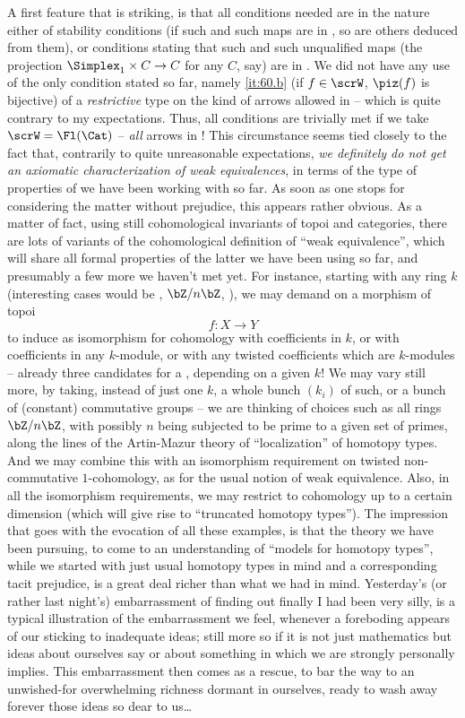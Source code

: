 A first feature that is striking, is that all conditions needed are in
the nature either of stability conditions (if such and such maps are
in \scrW, so are others deduced from them), or conditions stating that
such and such unqualified maps (the projection $\Simplex_1\times C\to C$
for any $C$, say) are in \scrW. We did not have any use of the only
condition stated so far, namely \ref{it:60.b} (if $f\in\scrW$,
$\piz(f)$ is bijective) of a \emph{restrictive} type on the kind of
arrows allowed in \scrW{} -- which is quite contrary to my
expectations. Thus, all conditions are trivially met if we
take $\scrW=\Fl(\Cat)$ -- \emph{all} arrows in \Cat! This
circumstance seems tied closely to the fact that, contrarily to quite
unreasonable expectations, \emph{we definitely do \emph{not} get an
  axiomatic characterization of weak equivalences}, in terms of the
type of properties of \scrW{} we have been working with so far. As
soon as one stops for considering the matter without prejudice, this
appears rather obvious. As a matter of fact, using still cohomological
invariants of topoi and categories, there are lots of variants of the
cohomological definition of ``weak equivalence'', which will share all
formal properties of the latter we have been using so far, and
presumably a few more we haven't met yet. For instance, starting with
any ring $k$ (interesting cases would be \bZ, $\bZ/n\bZ$, \bQ), we may
demand on a morphism of topoi
\[f:X\to Y\]
to induce as isomorphism for cohomology with coefficients in $k$, or
with coefficients in any $k$-module, or with any twisted coefficients
which are $k$-modules -- already three candidates for a \scrW,
depending on a given $k$! We may vary still more, by taking, instead
of just one $k$, a whole bunch $(k_i)$ of such, or a bunch of
(constant) commutative groups -- we are thinking of choices such as
all rings $\bZ/n\bZ$, with possibly $n$ being subjected to be prime to
a given set of primes, along the lines of the Artin-Mazur theory of
``localization'' of homotopy types. And we may combine this with an
isomorphism requirement on twisted non-commutative $1$-cohomology, as
for the usual notion of weak equivalence. Also, in all the isomorphism
requirements, we may restrict to cohomology up to a certain dimension
(which will give rise to ``truncated homotopy types''). The impression
that goes with the evocation of all these examples, is that the theory
we have been pursuing, to come to an understanding of ``models for
homotopy types'', while we started with just usual homotopy types in
mind and a corresponding tacit prejudice, is a great deal richer than
what we had in mind. Yesterday's (or rather last night's)
embarrassment of finding out finally I had been very silly, is a
typical illustration of the embarrassment we feel, whenever a
foreboding appears of our sticking to inadequate ideas; still more so
if it is not just mathematics but ideas about ourselves say or about
something in which we are strongly personally implies. This
embarrassment then comes as a rescue, to bar the way to an
unwished-for overwhelming richness dormant in ourselves, ready to wash
away forever those ideas so dear to us\ldots

